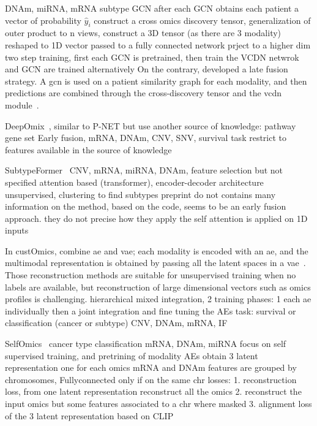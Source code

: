 \documentclass[../main.tex]{subfiles}
\begin{document}
\cite{MOGONET} DNAm, miRNA, mRNA subtype GCN 
after each GCN obtains each patient a vector of probability \(\hat{y}_{i}\)
construct a cross omics discovery tensor, generalization of outer product to n views, construct a 3D tensor (as there are 3 modality) reshaped to 1D vector passed to a fully connected network 
prject to a higher dim 
two step training, first each GCN is pretrained, then train the VCDN netwrok and GCN are trained alternatively
On the contrary, \citeauthor{MOGONET} developed a late fusion strategy.
A \gls{gcn} is used on a patient similarity graph for each modality, and then predictions are combined through the cross-discovery tensor and the \gls{vcdn} module~\cite{MOGONET}.

DeepOmix~\cite{DeepOmix}, similar to P-NET but use another source of knowledge: pathway gene set
Early fusion, mRNA, DNAm, CNV, SNV, survival task
restrict to features available in the source of knowledge

SubtypeFormer~\cite{SubtypeFormer} 
CNV, mRNA, miRNA, DNAm, feature selection but not specified
attention based (transformer), encoder-decoder architecture 
unsupervised, clustering to find subtypes 
preprint do not contains many information on the method, based on the code, seems to be an early fusion approach. 
they do not precise how they apply the self attention is applied on 1D inputs 

In custOmics, \citeauthor{customics} combine \gls{ae} and \gls{vae}; each modality is encoded with an \gls{ae}, and the multimodal representation is obtained by passing all the latent spaces in a \gls{vae}~\cite{customics}.
Those reconstruction methods are suitable for unsupervised training when no labels are available, but reconstruction of large dimensional vectors such as omics profiles is challenging. 
hierarchical mixed integration, 2 training phases: 1 each ae individually then a joint integration and fine tuning the AEs
task: survival or classification (cancer or subtype)
CNV, DNAm, mRNA, IF 

SelfOmics~\cite{selfOmics}
cancer type classification 
mRNA, DNAm, miRNA
focus on self supervised training, and pretrining of modality AEs
obtain 3 latent representation one for each omics 
mRNA and DNAm features are grouped by chromosomes, Fullyconnected only if on the same chr 
losses: 
1. reconstruction loss, from one latent representation reconstruct all the omics 
2. reconstruct the input omics but some features associated to a chr where masked 
3. alignment loss of the 3 latent representation based on CLIP 
\end{document}

